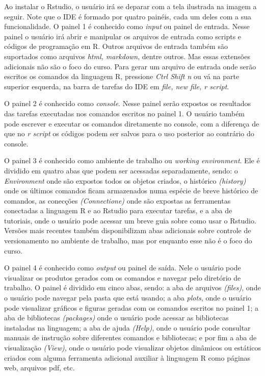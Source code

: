 \documentclass[
  letterpaper,
  DIV=11,
  numbers=noendperiod]{scrreprt}
\begin{document}
Ao instalar o Rstudio, o usuário irá se deparar com a tela ilustrada na
imagem a seguir. Note que o IDE é formado por quatro painéis, cada um
deles com a sua funcionalidade. O painel 1 é conhecido como \emph{input}
ou painel de entrada. Nesse painel o usuário irá abrir e manipular os
arquivos de entrada como scripts e códigos de programação em R. Outros
arquivos de entrada também são suportados como arquivos \emph{html,
markdown}, dentre outros. Mas essas extensões adicionais não são o foco
do curso. Para gerar um arquivo de entrada onde serão escritos os
comandos da linguagem R, pressione \emph{Ctrl Shift n} ou vá na parte
superior esquerda, na barra de tarefas do IDE em \emph{file, new file, r
script}.

O painel 2 é conhecido como \emph{console}. Nesse painel serão expostos
os resultados das tarefas executadas nos comandos escritos no painel 1.
O usuário também pode escrever e executar os comandos diretamente no
console, com a diferença de que no \emph{r script} os códigos podem ser
salvos para o uso posterior ao contrário do console.

O painel 3 é conhecido como ambiente de trabalho ou \emph{working
environment}. Ele é dividido em quatro abas que podem ser acessadas
separadamente, sendo: o \emph{Environment} onde são expostos todos os
objetos criados, o histórico \emph{(history)} onde os últimos comandos
ficam armazenados numa espécie de breve histórico de comandos, as
conecções \emph{(Connectione)} onde são expostas as ferramentas
conectadas a linguagem R e ao Rstudio para executar tarefas, e a aba de
tutoriais, onde o usuário pode acessar um breve guia sobre como usar o
Rstudio. Versões mais recentes também disponibilizam abas adicionais
sobre controle de versionamento no ambiente de trabalho, mas por
enquanto esse não é o foco do curso.

O painel 4 é conhecido como \emph{output} ou painel de saída. Nele o
usuário pode visualizar os produtos gerados com os comandos e navegar
pelo diretório de trabalho. O painel é dividido em cinco abas, sendo: a
aba de arquivos \emph{(files)}, onde o usuário pode navegar pela pasta
que está usando; a aba \emph{plots}, onde o usuário pode visualizar
gráficos e figuras geradas com os comandos escritos no painel 1; a aba
de bibliotecas \emph{(packages)} onde o usuário pode acessar as
bibliotecas instaladas na linguagem; a aba de ajuda \emph{(Help)}, onde
o usuário pode consultar manuais de instrução sobre diferentes comandos
e bibliotecas; e por fim a aba de visualização \emph{(View)}, onde o
usuário pode visualizar objetos dinâmicos ou estáticos criados com
alguma ferramenta adicional auxiliar à linguagem R como páginas web,
arquivos pdf, etc.
\end{document}
